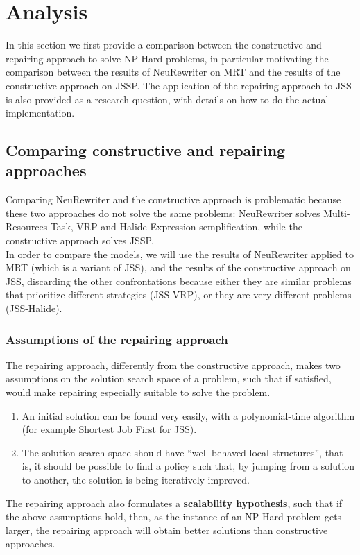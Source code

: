 \documentclass[12pt]{article}
\begin{document}
\section{Analysis}
\label{sec:analysis}
In this section we first provide a comparison between the constructive and repairing approach to solve NP-Hard problems, in particular motivating the comparison between the results of NeuRewriter \cite{neu_rewriter} on MRT and the results of the constructive approach \cite{pierre_constructive_approach} on JSSP. 
The application of the repairing approach to JSS is also provided as a research question, with details on how to do the actual implementation.

\subsection{Comparing constructive and repairing approaches}
Comparing NeuRewriter and the constructive approach is problematic because these two approaches do not solve the same problems:
 NeuRewriter solves Multi-Resources Task, VRP and Halide Expression semplification, while the constructive approach solves JSSP.\\
 In order to compare the models, we will use the results of NeuRewriter applied to MRT (which is a variant of JSS), and the results of the constructive approach on JSS, discarding 
 the other confrontations because either they are similar problems that prioritize different strategies (JSS-VRP)\cite{VRP_vs_JSS}, or they are very different problems (JSS-Halide).\\

\subsubsection{Assumptions of the repairing approach}
The repairing approach, differently from the constructive approach, makes two assumptions on the solution search space of a problem, such that if satisfied, would make repairing especially suitable to solve the problem.
\begin{enumerate}
    \item An initial solution can be found very easily, with a polynomial-time algorithm (for example Shortest Job First for JSS).
    \item The solution search space should have ``well-behaved local structures'', that is, it should be possible to find a policy such that, by jumping from a solution to another, the solution is being iteratively improved.
\end{enumerate}
The repairing approach also formulates a \textbf{scalability hypothesis}, such that if the above assumptions hold, then, as the instance of an NP-Hard problem gets larger, the repairing approach will obtain better solutions than constructive approaches.
\end{document}
